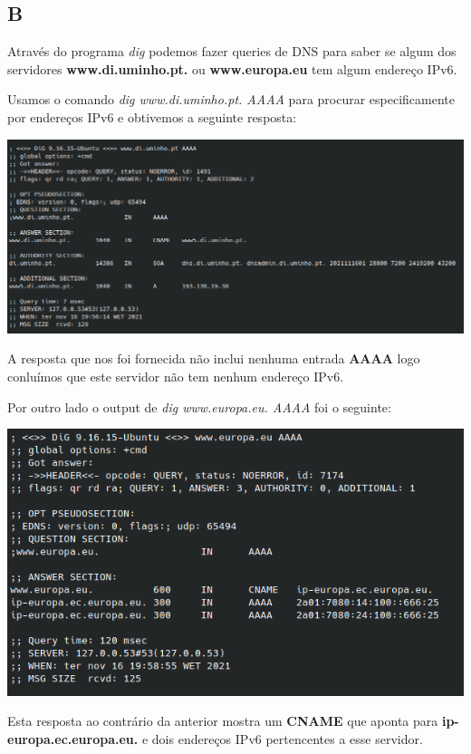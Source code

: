 \documentclass[size=11pt]{report}
\begin{document}
        \subsection*{B}
                Através do programa \textit{dig} podemos fazer queries de DNS para saber se algum dos servidores \textbf{www.di.uminho.pt.} ou \textbf{www.europa.eu}
            tem algum endereço IPv6.\par
                Usamos o comando \textit{dig www.di.uminho.pt. AAAA} para procurar especificamente por endereços IPv6 e obtivemos a seguinte resposta:    
            \par
            \noindent
            \includegraphics[width=\textwidth]{images/dig_di.png}
            \par
                A resposta que nos foi fornecida não inclui nenhuma entrada \textbf{AAAA} logo conluímos que este servidor não tem nenhum endereço IPv6.

                \vspace{0.45em}
                Por outro lado o output de \textit{dig www.europa.eu. AAAA} foi o seguinte:
            \par
            \noindent
            \includegraphics[width=\textwidth]{images/dig_europa.png}
            \par
                Esta resposta ao contrário da anterior mostra um \textbf{CNAME} que aponta para \textbf{ip-europa.ec.europa.eu.} e dois endereços IPv6 pertencentes a esse servidor.
        \pagebreak
\end{document}
